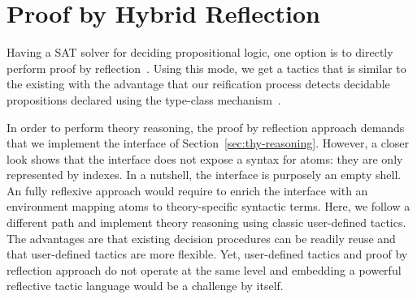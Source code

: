 \documentclass[utf8,a4paper,UKenglish,cleveref, autoref, thm-restate]{lipics-v2019}
\begin{document}
\section{Proof by Hybrid Reflection}
\label{sec:reflection}
Having a SAT solver for deciding propositional logic, one option is to
directly perform proof by
reflection~\cite[Chap. 16]{casteran:hal-00344237}. Using this mode, we
get a tactics that is similar to the existing  with the
advantage that our reification process detects decidable propositions
declared using the type-class mechanism~\cite{SozeauO08}.
%

In order to perform theory reasoning, the proof by reflection approach
demands that we implement the interface of
Section~\ref{sec:thy-reasoning}. However, a closer look shows that the
interface does not expose a syntax for atoms: they are only
represented by indexes. In a nutshell, the interface is purposely  an
empty shell. An fully reflexive approach would require to enrich the
interface with an environment mapping atoms to theory-specific
syntactic terms.
%
Here, we follow a different path and implement theory reasoning using
classic user-defined tactics.
%
The advantages are that existing decision procedures can be readily
reuse and that user-defined tactics are more flexible.
%
Yet, user-defined tactics and proof by reflection approach do not
operate at the same level and embedding a powerful reflective tactic language
would be a challenge by itself.
\end{document}
